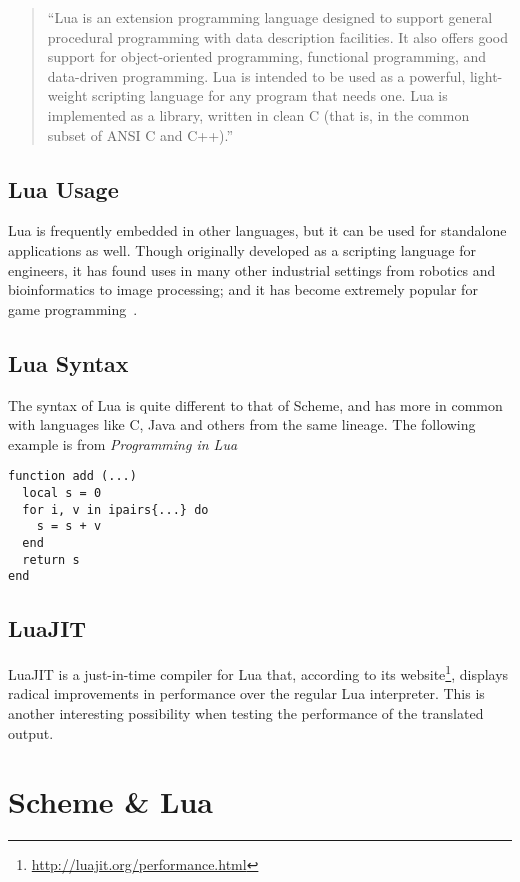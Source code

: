 \begin{quotation}
``Lua is an extension programming language designed to support general
procedural programming with data description facilities. It also offers good
support for object-oriented programming, functional programming, and data-driven
programming. Lua is intended to be used as a powerful, light-weight scripting
language for any program that needs one. Lua is implemented as a library,
written in clean C (that is, in the common subset of ANSI C and
C++).''~\cite[Sec~1]{luamanual}
\end{quotation}
\subsection{Lua Usage}

Lua is frequently embedded in other languages, but it can be used for
stand\-alone applications as well. Though originally developed as a scripting
language for engineers, it has found uses in many other industrial settings from
robotics and bioinformatics to image processing; and it has become extremely
popular for game programming~\cite{evolua}.

\subsection{Lua Syntax}

The syntax of Lua is quite different to that of Scheme, and has more in common
with languages like C, Java and others from the same lineage. The following example is from \emph{Programming in Lua}~\cite[p.40]{luabook}
\begin{framed}
\begin{verbatim}
function add (...)
  local s = 0
  for i, v in ipairs{...} do
    s = s + v
  end
  return s
end
\end{verbatim}
\end{framed}

\subsection{LuaJIT}

LuaJIT\cite{luajit} is a just-in-time compiler for Lua that, according to its
website\footnote{\url{http://luajit.org/performance.html}}, displays radical
improvements in performance over the regular Lua interpreter. This is another
interesting possibility when testing the performance of the translated output.


\section{Scheme \& Lua}


